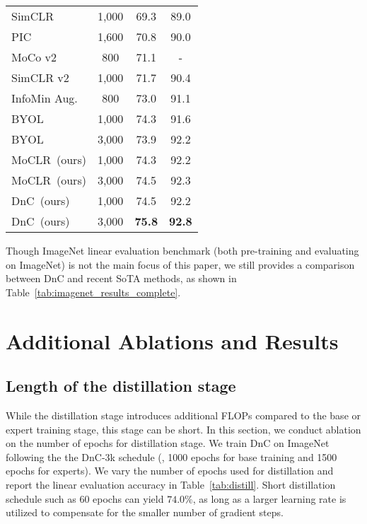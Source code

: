 \documentclass[final]{cvpr}
\newcommand\baseline{MoCLR}
\begin{document}
\begin{table}[t]
\begin{center}
\begin{small}
\begin{tabular}{lccc}
SimCLR \cite{chen2020simple} & 1,000 & 69.3 & 89.0 \\
PIC \cite{cao2020parametric} & 1,600 & 70.8 & 90.0 \\
MoCo v2 \cite{chen2020improved} & \hspace{1.5ex}800 & 71.1 & - \\
SimCLR v2 \cite{chen2020big} & 1,000 & 71.7 & 90.4\\
InfoMin Aug. \cite{tian2020makes} & \hspace{1.5ex}800 & 73.0 & 91.1 \\
BYOL \cite{grill2020bootstrap} & 1,000 & 74.3 & 91.6\\
BYOL \cite{grill2020bootstrap} & 3,000 & 73.9 & 92.2 \\
\baseline{}~(ours)  & 1,000 & 74.3 & 92.2 \\
\baseline{}~(ours)  & 3,000 & 74.5 & 92.3 \\
DnC~(ours)          & 1,000 & \cellcolor{DnCBG}74.5 & \cellcolor{DnCBG}92.2 \\
DnC~(ours) & 3,000 & \cellcolor{DnCBG}\textbf{75.8} & \cellcolor{DnCBG}\textbf{92.8} \\
\bottomrule
\end{tabular}
\end{small}
\end{center}
\end{table} 
Though ImageNet linear evaluation benchmark (both pre-training and evaluating on ImageNet) is not the main focus of this paper, we still provides a comparison between DnC and recent SoTA methods, as shown in Table~\ref{tab:imagenet_results_complete}.


\section{Additional Ablations and Results}

\subsection{Length of the distillation stage}
While the distillation stage introduces additional FLOPs compared to the base or expert training stage, this stage can be short. In this section, we conduct ablation on the number of epochs for distillation stage. We train DnC on ImageNet following the the DnC-3k schedule (\ie, 1000 epochs for base training and 1500 epochs for experts). We vary the number of epochs used for distillation and report the linear evaluation accuracy in Table~\ref{tab:distill}. Short distillation schedule such as 60 epochs can yield $74.0\%$, as long as a larger learning rate is utilized to compensate for the smaller number of gradient steps.
\end{document}
